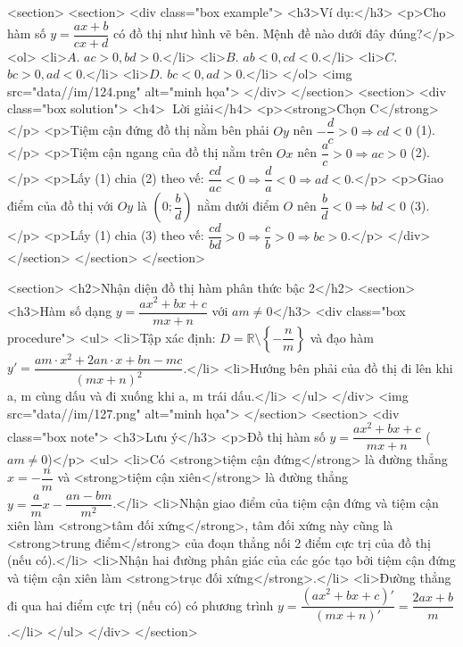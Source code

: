     <section>
        <section>
            <div class="box example">
                <h3>Ví dụ:</h3>
                <p>Cho hàm số \(y = \dfrac{ax+b}{cx+d}\) có đồ thị như hình vẽ bên. Mệnh đề nào dưới đây đúng?</p>
                <ol>
                    <li>\(A.\) \(ac > 0, bd > 0\).</li>
                    <li>\(B.\) \(ab < 0, cd < 0\).</li>
                    <li>\(C.\) \(bc > 0, ad < 0\).</li>
                    <li>\(D.\) \(bc < 0, ad > 0\).</li>
                </ol>
                <img src="data//im/124.png" alt="minh họa">
            </div>
        </section>
        <section>
            <div class="box solution">
                <h4>📝 Lời giải</h4>
                <p><strong>Chọn C</strong></p>
                <p>Tiệm cận đứng đồ thị nằm bên phải \(Oy\) nên \(-\dfrac{d}{c} > 0 \Rightarrow cd < 0\) (1).</p>
                <p>Tiệm cận ngang của đồ thị nằm trên \(Ox\) nên \(\dfrac{a}{c} > 0 \Rightarrow ac > 0\) (2).</p>
                <p>Lấy (1) chia (2) theo vế: \(\dfrac{cd}{ac} < 0 \Rightarrow \dfrac{d}{a} < 0 \Rightarrow ad < 0\).</p>
                <p>Giao điểm của đồ thị với \(Oy\) là \(\left(0; \dfrac{b}{d}\right)\) nằm dưới điểm \(O\) nên \(\dfrac{b}{d} < 0 \Rightarrow bd < 0\) (3).</p>
                <p>Lấy (1) chia (3) theo vế: \(\dfrac{cd}{bd} > 0 \Rightarrow \dfrac{c}{b} > 0 \Rightarrow bc > 0\).</p>
            </div>
        </section>
    </section>
</section>

<section>
    <h2>Nhận diện đồ thị hàm phân thức bậc 2</h2>
    <section>
        <h3>Hàm số dạng \(y = \dfrac{ax^2+bx+c}{mx+n}\) với \(am \ne 0\)</h3>
        <div class="box procedure">
            <ul>
                <li>Tập xác định: \(D = \mathbb{R} \setminus \left\{-\dfrac{n}{m}\right\}\) và đạo hàm \(y' = \dfrac{am \cdot x^2 + 2an \cdot x + bn - mc}{(mx+n)^2}\).</li>
                <li>Hướng bên phải của đồ thị đi lên khi a, m cùng dấu và đi xuống khi a, m trái dấu.</li>
            </ul>
        </div>
        <img src="data//im/127.png" alt="minh họa">
    </section>
    <section>
        <div class="box note">
            <h3>Lưu ý</h3>
            <p>Đồ thị hàm số \(y = \dfrac{ax^2+bx+c}{mx+n}\) (\(am \ne 0\))</p>
            <ul>
                <li>Có <strong>tiệm cận đứng</strong> là đường thẳng \(x = -\dfrac{n}{m}\) và <strong>tiệm cận xiên</strong> là đường thẳng \(y = \dfrac{a}{m}x - \dfrac{an-bm}{m^2}\).</li>
                <li>Nhận giao điểm của tiệm cận đứng và tiệm cận xiên làm <strong>tâm đối xứng</strong>, tâm đối xứng này cũng là <strong>trung điểm</strong> của đoạn thẳng nối 2 điểm cực trị của đồ thị (nếu có).</li>
                <li>Nhận hai đường phân giác của các góc tạo bởi tiệm cận đứng và tiệm cận xiên làm <strong>trục đối xứng</strong>.</li>
                <li>Đường thẳng đi qua hai điểm cực trị (nếu có) có phương trình
                    \(y = \dfrac{(ax^2+bx+c)'}{(mx+n)'} = \dfrac{2ax+b}{m}\).</li>
            </ul>
        </div>
    </section>

